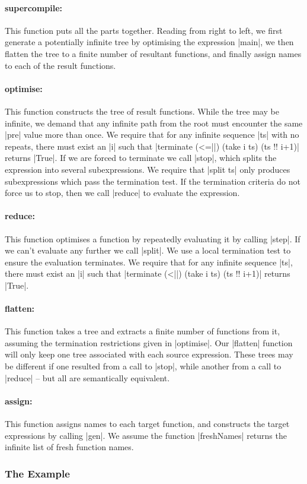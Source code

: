 \documentclass[draft]{sigplanconf}
\begin{document}
\newcommand{\function}[1]{\paragraph{\textsf{#1:}}\hspace{-3mm}}

\function{supercompile} This function puts all the parts together. Reading from right to left, we first generate a potentially infinite tree by optimising the expression |main|, we then flatten the tree to a finite number of resultant functions, and finally assign names to each of the result functions.

\function{optimise} This function constructs the tree of result functions. While the tree may be infinite, we demand that any infinite path from the root must encounter the same |pre| value more than once. We require that for any infinite sequence |ts| with no repeats, there must exist an |i| such that |terminate (<=||) (take i ts) (ts !! i+1)| returns |True|. If we are forced to terminate we call |stop|, which splits the expression into several subexpressions. We require that |split ts| only produces subexpressions which pass the termination test. If the termination criteria do not force us to stop, then we call |reduce| to evaluate the expression.

\function{reduce} This function optimises a function by repeatedly evaluating it by calling |step|. If we can't evaluate any further we call |split|. We use a local termination test to ensure the evaluation terminates. We require that for any infinite sequence |ts|, there must exist an |i| such that |terminate (<||) (take i ts) (ts !! i+1)| returns |True|.

\function{flatten} This function takes a tree and extracts a finite number of functions from it, assuming the termination restrictions given in |optimise|. Our |flatten| function will only keep one tree associated with each source expression. These trees may be different if one resulted from a call to |stop|, while another from a call to |reduce| -- but all are semantically equivalent.

\function{assign} This function assigns names to each target function, and constructs the target expressions by calling |gen|. We assume the function |freshNames| returns the infinite list of fresh function names.

\subsubsection{The Example}
\label{sec:manager_example}
\end{document}
